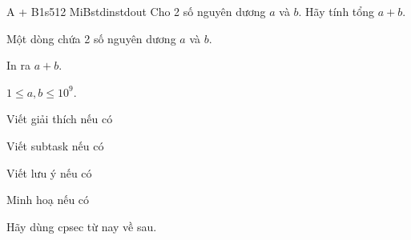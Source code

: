\begin{statement}{A + B}{1s}{512 MiB}{stdin}{stdout}
Cho 2 số nguyên dương $a$ và $b$. Hãy tính tổng $a + b$.

\InputFile
Một dòng chứa 2 số nguyên dương $a$ và $b$.

\OutputFile
In ra $a + b$.

\Constraints
$1 \le a, b \le 10^9$.

\Example
\begin{example}
%
%
\end{example}

\begin{examplethree}
%
%
\end{examplethree}

\Explanations

Viết giải thích nếu có

\Scoring

Viết subtask nếu có

\Notes

Viết lưu ý nếu có

\Illustration

Minh hoạ nếu có


Hãy dùng cpsec từ nay về sau.
\end{statement}